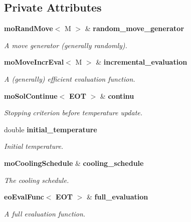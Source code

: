 \subsection*{Private Attributes}
\begin{CompactItemize}
\item 
{\bf mo\-Rand\-Move}$<$ M $>$ \& {\bf random\_\-move\_\-generator}\label{classmo_s_a_r0}

\begin{CompactList}\small\item\em A move generator (generally randomly). \item\end{CompactList}\item 
{\bf mo\-Move\-Incr\-Eval}$<$ M $>$ \& {\bf incremental\_\-evaluation}\label{classmo_s_a_r1}

\begin{CompactList}\small\item\em A (generally) efficient evaluation function. \item\end{CompactList}\item 
{\bf mo\-Sol\-Continue}$<$ {\bf EOT} $>$ \& {\bf continu}\label{classmo_s_a_r2}

\begin{CompactList}\small\item\em Stopping criterion before temperature update. \item\end{CompactList}\item 
double {\bf initial\_\-temperature}\label{classmo_s_a_r3}

\begin{CompactList}\small\item\em Initial temperature. \item\end{CompactList}\item 
{\bf mo\-Cooling\-Schedule} \& {\bf cooling\_\-schedule}\label{classmo_s_a_r4}

\begin{CompactList}\small\item\em The cooling schedule. \item\end{CompactList}\item 
{\bf eo\-Eval\-Func}$<$ {\bf EOT} $>$ \& {\bf full\_\-evaluation}\label{classmo_s_a_r5}

\begin{CompactList}\small\item\em A full evaluation function. \item\end{CompactList}\end{CompactItemize}


